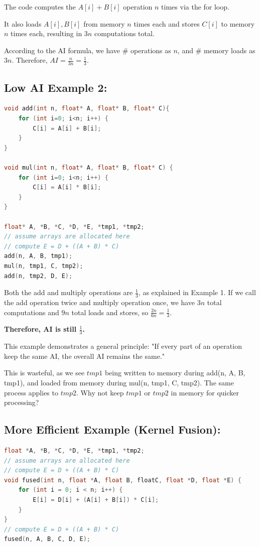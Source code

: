 \documentclass[twoside]{article}
\begin{document}
The code computes the $A[i] + B[i]$ operation $n$ times via the for loop. 

It also loads $A[i], B[i]$ from memory $n$ times each and stores $C[i]$ to memory $n$ times each, resulting in $3n$ computations total.

According to the AI formula, we have $\#$ operations as $n$, and $\#$ memory loads as $3n$. Therefore, $AI = \frac{n}{3n} = \frac{1}{3}$.


\subsection{Low AI Example 2:}
\begin{lstlisting}[language=C++, title={Simple add() and mul() kernel}]
void add(int n, float* A, float* B, float* C){
    for (int i=0; i<n; i++) {
        C[i] = A[i] + B[i];
    }
}

void mul(int n, float* A, float* B, float* C) {
    for (int i=0; i<n; i++) {
        C[i] = A[i] * B[i];
    }
}

float* A, *B, *C, *D, *E, *tmp1, *tmp2;
// assume arrays are allocated here
// compute E = D + ((A + B) * C)
add(n, A, B, tmp1);
mul(n, tmp1, C, tmp2);
add(n, tmp2, D, E);
\end{lstlisting}

Both the add and multiply operations are $\frac{1}{3}$, as explained in Example 1. If we call the add operation twice and multiply operation once, we have $3n$ total computations and $9n$ total loads and stores, so $\frac{2n}{6n} = \frac{1}{3}.$

\textbf{Therefore, AI is still $\frac{1}{3}$.} 

This example demonstrates a general principle: "If every part of an operation keep the same AI, the overall AI remains the same."

This is wasteful, as we see $tmp1$ being written to memory during add(n, A, B, tmp1), and loaded from memory during mul(n, tmp1, C, tmp2). The same process applies to $tmp2$. Why not keep $tmp1$ or $tmp2$ in memory for quicker processing?


\subsection{More Efficient Example (Kernel Fusion):}
\begin{lstlisting}[language=C++, title={Fused kernel}]
float *A, *B, *C, *D, *E, *tmp1, *tmp2;
// assume arrays are allocated here
// compute E = D + ((A + B) * C)
void fused(int n, float *A, float B, floatC, float *D, float *E) {
    for (int i = 0; i < n; i++) {
        E[i] = D[i] + (A[i] + B[i]) * C[i];
    }
}
// compute E = D + ((A + B) * C)
fused(n, A, B, C, D, E);
\end{lstlisting}
\end{document}

